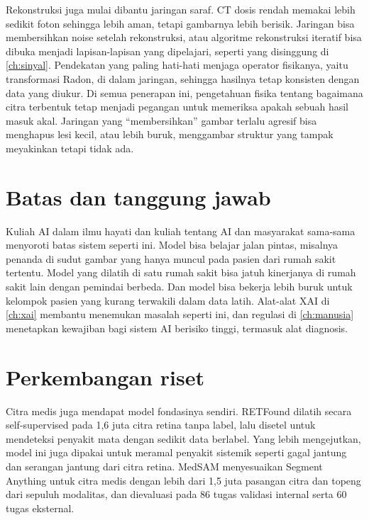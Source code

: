 Rekonstruksi juga mulai dibantu jaringan saraf. CT dosis rendah memakai lebih sedikit foton sehingga lebih aman, tetapi
gambarnya lebih berisik. Jaringan bisa membersihkan noise setelah rekonstruksi, atau algoritme rekonstruksi iteratif bisa
dibuka menjadi lapisan-lapisan yang dipelajari, seperti yang disinggung di \cref{ch:sinyal}. Pendekatan yang paling hati-hati
menjaga operator fisikanya, yaitu transformasi Radon, di dalam jaringan, sehingga hasilnya tetap konsisten dengan data yang
diukur. Di semua penerapan ini, pengetahuan fisika tentang bagaimana citra terbentuk tetap menjadi pegangan untuk memeriksa
apakah sebuah hasil masuk akal. Jaringan yang ``membersihkan'' gambar terlalu agresif bisa menghapus lesi kecil, atau lebih
buruk, menggambar struktur yang tampak meyakinkan tetapi tidak ada.

\section{Batas dan tanggung jawab}

Kuliah AI dalam ilmu hayati dan kuliah tentang AI dan masyarakat sama-sama menyoroti batas sistem seperti ini. Model bisa
belajar jalan pintas, misalnya penanda di sudut gambar yang hanya muncul pada pasien dari rumah sakit tertentu. Model yang
dilatih di satu rumah sakit bisa jatuh kinerjanya di rumah sakit lain dengan pemindai berbeda. Dan model bisa bekerja lebih
buruk untuk kelompok pasien yang kurang terwakili dalam data latih. Alat-alat XAI di \cref{ch:xai} membantu menemukan masalah
seperti ini, dan regulasi di \cref{ch:manusia} menetapkan kewajiban bagi sistem AI berisiko tinggi, termasuk alat diagnosis.

\section{Perkembangan riset}

Citra medis juga mendapat model fondasinya sendiri. RETFound \citep{zhou2023retfound} dilatih secara self-supervised pada
1,6 juta citra retina tanpa label, lalu disetel untuk mendeteksi penyakit mata dengan sedikit data berlabel. Yang lebih
mengejutkan, model ini juga dipakai untuk meramal penyakit sistemik seperti gagal jantung dan serangan jantung dari citra
retina. MedSAM \citep{ma2024medsam} menyesuaikan Segment Anything untuk citra medis dengan lebih dari 1,5 juta pasangan citra
dan topeng dari sepuluh modalitas, dan dievaluasi pada 86 tugas validasi internal serta 60 tugas eksternal.

